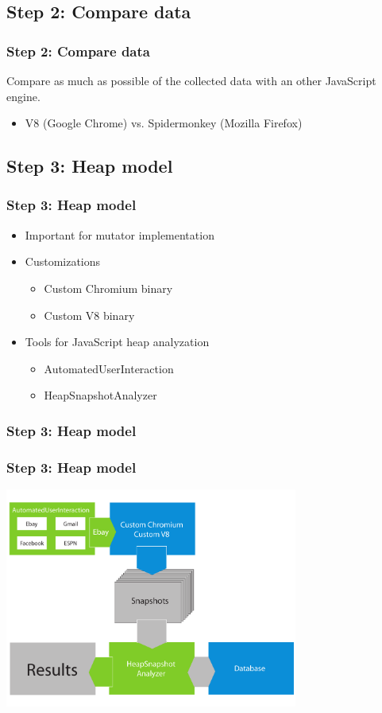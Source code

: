 \documentclass[xcolor=x11names,compress]{beamer}
\begin{document}
	\subsection{Step 2: Compare data}
	\begin{frame}
		\frametitle{Step 2: Compare data}
		Compare as much as possible of the collected data with an other JavaScript engine.
		\begin{itemize}
			\item V8 (Google Chrome) vs. Spidermonkey (Mozilla Firefox)
		\end{itemize} 
	\end{frame}
	
	\subsection{Step 3: Heap model}
	\begin{frame}
		\frametitle{Step 3: Heap model}
		\begin{itemize}
			\item Important for mutator implementation
			\item Customizations
			\begin{itemize}
				\item Custom Chromium binary
				\item Custom V8 binary
			\end{itemize}
			
			\pause
			
			\item Tools for JavaScript heap analyzation
			\begin{itemize}
				\item AutomatedUserInteraction
				\item HeapSnapshotAnalyzer
			\end{itemize}
		\end{itemize}
	\end{frame}

	\subsubsection{Step 3: Heap model}
	\begin{frame}
		\frametitle{Step 3: Heap model}		
		\includegraphics[width=26em]{./imgs/solution_h.pdf}
	\end{frame}
\end{document}
